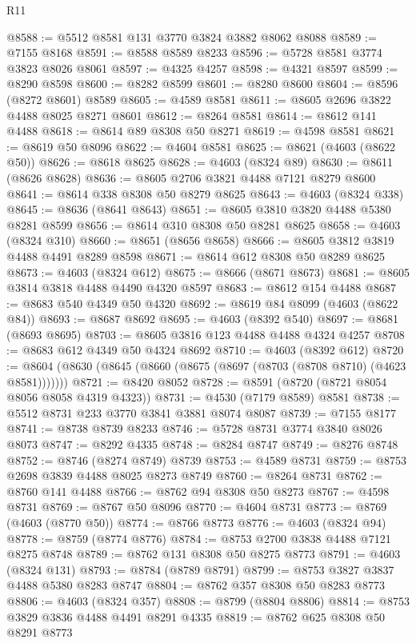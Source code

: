 \begin{lexlean}{R11}
\begin{coremodule}
@8588 := @5512 @8581 @131 @3770 @3824 @3882 @8062 @8088
@8589 := @7155 @8168
@8591 := @8588 @8589 @8233
@8596 := @5728 @8581 @3774 @3823 @8026 @8061
@8597 := @4325 @4257
@8598 := @4321 @8597
@8599 := @8290 @8598
@8600 := @8282 @8599
@8601 := @8280 @8600
@8604 := @8596 (@8272 @8601) @8589
@8605 := @4589 @8581
@8611 := @8605 @2696 @3822 @4488 @8025 @8271 @8601
@8612 := @8264 @8581
@8614 := @8612 @141 @4488
@8618 := @8614 @89 @8308 @50 @8271
@8619 := @4598 @8581
@8621 := @8619 @50 @8096
@8622 := @4604 @8581
@8625 := @8621 (@4603 (@8622 @50))
@8626 := @8618 @8625
@8628 := @4603 (@8324 @89)
@8630 := @8611 (@8626 @8628)
@8636 := @8605 @2706 @3821 @4488 @7121 @8279 @8600
@8641 := @8614 @338 @8308 @50 @8279 @8625
@8643 := @4603 (@8324 @338)
@8645 := @8636 (@8641 @8643)
@8651 := @8605 @3810 @3820 @4488 @5380 @8281 @8599
@8656 := @8614 @310 @8308 @50 @8281 @8625
@8658 := @4603 (@8324 @310)
@8660 := @8651 (@8656 @8658)
@8666 := @8605 @3812 @3819 @4488 @4491 @8289 @8598
@8671 := @8614 @612 @8308 @50 @8289 @8625
@8673 := @4603 (@8324 @612)
@8675 := @8666 (@8671 @8673)
@8681 := @8605 @3814 @3818 @4488 @4490 @4320 @8597
@8683 := @8612 @154 @4488
@8687 := @8683 @540 @4349 @50 @4320
@8692 := @8619 @84 @8099 (@4603 (@8622 @84))
@8693 := @8687 @8692
@8695 := @4603 (@8392 @540)
@8697 := @8681 (@8693 @8695)
@8703 := @8605 @3816 @123 @4488 @4488 @4324 @4257
@8708 := @8683 @612 @4349 @50 @4324 @8692
@8710 := @4603 (@8392 @612)
@8720 := @8604 (@8630 (@8645 (@8660 (@8675 (@8697 (@8703 (@8708 @8710) (@4623 @8581)))))))
@8721 := @8420 @8052
@8728 := @8591 (@8720 (@8721 @8054 @8056 @8058 @4319 @4323))
@8731 := @4530 (@7179 @8589) @8581
@8738 := @5512 @8731 @233 @3770 @3841 @3881 @8074 @8087
@8739 := @7155 @8177
@8741 := @8738 @8739 @8233
@8746 := @5728 @8731 @3774 @3840 @8026 @8073
@8747 := @8292 @4335
@8748 := @8284 @8747
@8749 := @8276 @8748
@8752 := @8746 (@8274 @8749) @8739
@8753 := @4589 @8731
@8759 := @8753 @2698 @3839 @4488 @8025 @8273 @8749
@8760 := @8264 @8731
@8762 := @8760 @141 @4488
@8766 := @8762 @94 @8308 @50 @8273
@8767 := @4598 @8731
@8769 := @8767 @50 @8096
@8770 := @4604 @8731
@8773 := @8769 (@4603 (@8770 @50))
@8774 := @8766 @8773
@8776 := @4603 (@8324 @94)
@8778 := @8759 (@8774 @8776)
@8784 := @8753 @2700 @3838 @4488 @7121 @8275 @8748
@8789 := @8762 @131 @8308 @50 @8275 @8773
@8791 := @4603 (@8324 @131)
@8793 := @8784 (@8789 @8791)
@8799 := @8753 @3827 @3837 @4488 @5380 @8283 @8747
@8804 := @8762 @357 @8308 @50 @8283 @8773
@8806 := @4603 (@8324 @357)
@8808 := @8799 (@8804 @8806)
@8814 := @8753 @3829 @3836 @4488 @4491 @8291 @4335
@8819 := @8762 @625 @8308 @50 @8291 @8773

\end{coremodule}
\end{lexlean}
